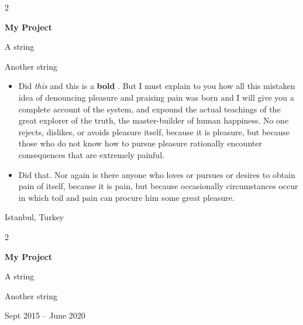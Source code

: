 \documentclass[10pt, letterpaper]{article}
\newenvironment{summary}{
    \begin{description}[
        topsep=0.10 cm,
        parsep=0.10 cm,
        partopsep=0pt,
        itemsep=0pt,
        leftmargin=0.4 cm + 10pt
    ]
}{
    \end{description}
} %
\newenvironment{highlights}{
    \begin{itemize}[
        topsep=0.10 cm,
        parsep=0.10 cm,
        partopsep=0pt,
        itemsep=0pt,
        leftmargin=0.4 cm + 10pt
    ]
}{
    \end{itemize}
} %
\newenvironment{twocolentry}[2][]{
    \onecolentry
    \def\secondColumn{#2}
    \setcolumnwidth{\fill, 4.5 cm}
    \begin{paracol}{2}
}{
    \switchcolumn \raggedleft \secondColumn
    \end{paracol}
    \endonecolentry
} %
\let\hrefWithoutArrow\href
\renewcommand{\href}[2]{\hrefWithoutArrow{#1}{\ifthenelse{\equal{#2}{}}{ }{#2 }\raisebox{.15ex}{\footnotesize \faExternalLink*}}}
\begin{document}
        \begin{twocolentry}{
            Istanbul, Turkey
        }
            \textbf{My Project}
            \begin{summary}
                \item A string
                \item Another string
            \end{summary}
            \begin{highlights}
                \item Did \textit{this} and this is a \textbf{bold} \href{https://example.com}{link}. But I must explain to you how all this mistaken idea of denouncing pleasure and praising pain was born and I will give you a complete account of the system, and expound the actual teachings of the great explorer of the truth, the master-builder of human happiness. No one rejects, dislikes, or avoids pleasure itself, because it is pleasure, but because those who do not know how to pursue pleasure rationally encounter consequences that are extremely painful.
                \item Did that. Nor again is there anyone who loves or pursues or desires to obtain pain of itself, because it is pain, but because occasionally circumstances occur in which toil and pain can procure him some great pleasure.
            \end{highlights}
        \end{twocolentry}


        \vspace{0.2 cm}

        \begin{twocolentry}{
            Sept 2015 – June 2020
        }
            \textbf{My Project}
            \begin{summary}
                \item A string
                \item Another string
            \end{summary}
        \end{twocolentry}


        \vspace{0.2 cm}
\end{document}
